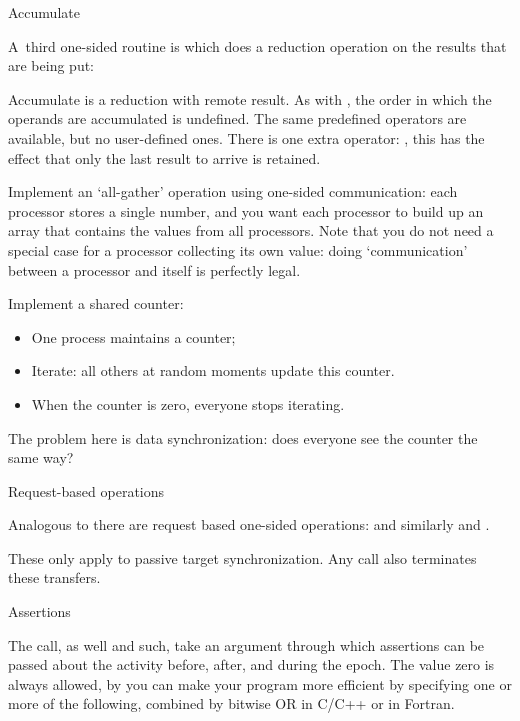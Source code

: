  {Accumulate}

A~third one-sided routine
is  which does a reduction operation on the results
that are being put:


Accumulate is a reduction with remote result. As with , the 
order in which the operands are accumulated is undefined. 
The same predefined operators are available, but no
user-defined ones. There is one extra operator: ,
this has the effect that only the last result to arrive is retained.

\begin{exercise}
  Implement an `all-gather' operation using one-sided communication:
  each processor stores a single number, and you want each processor
  to build up an array that contains the values from all
  processors. Note that you do not need a special case for a processor
  collecting its own value: doing `communication' between a processor
  and itself is perfectly legal.
\end{exercise}

\begin{exercise}
  \label{ex:countdown}

  Implement a shared counter:
  \begin{itemize}
  \item One process maintains a counter;
  \item Iterate: all others at random moments update this counter.
  \item When the counter is zero, everyone stops iterating.
  \end{itemize}
  The problem here is data synchronization: does everyone see the
  counter the same way?
\end{exercise}

 {Request-based operations}

Analogous to  there are request based one-sided operations:
%
%
and similarly  and .

These only apply to passive target synchronization.
Any  call also terminates these transfers.

 {Assertions}
\label{sec:mpi-assert}

The  call, as well  and such, take an argument
through which assertions can be passed about the activity before, after, and during the epoch.
The value zero is always allowed, by you can make your program more efficient by specifying
one or more of the following, combined by bitwise OR in C/C++ or
 in Fortran.

